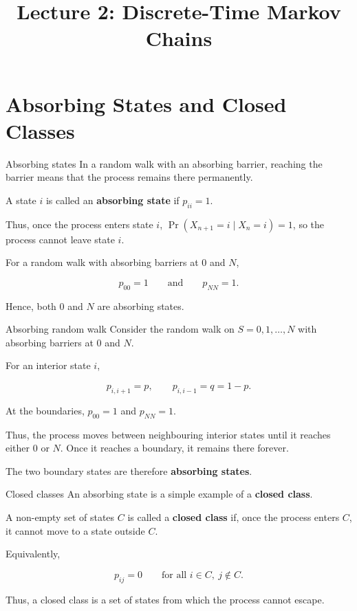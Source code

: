 \documentclass[
  ignorenonframetext,
  aspectratio=169,
]{beamer}
\title{\texorpdfstring{Lecture 2: Discrete-Time Markov
Chains}{Lecture 2: Discrete-Time Markov Chains}}
\author{}
\date{}
\begin{document}
\frame{\titlepage}


\section{Absorbing States and Closed
Classes}\label{absorbing-states-and-closed-classes}

\begin{frame}{Absorbing states}
\protect{}\label{absorbing-states}
In a random walk with an absorbing barrier, reaching the barrier means
that the process remains there permanently.

A state \(i\) is called an \textbf{absorbing state} if \(p_{ii}=1\).

Thus, once the process enters state \(i\),
\(\Pr(X_{n+1}=i\mid X_n=i)=1\), so the process cannot leave state \(i\).

For a random walk with absorbing barriers at \(0\) and \(N\),

\[
p_{00}=1
\qquad\text{and}\qquad
p_{NN}=1.
\]

Hence, both \(0\) and \(N\) are absorbing states.
\end{frame}

\begin{frame}{Absorbing random walk}
\protect{}\label{absorbing-random-walk}
Consider the random walk on \(S={0,1,\ldots,N}\) with absorbing barriers
at \(0\) and \(N\).

For an interior state \(i\),

\[
p_{i,i+1}=p,
\qquad
p_{i,i-1}=q=1-p.
\]

At the boundaries, \(p_{00}=1\) and \(p_{NN}=1\).

Thus, the process moves between neighbouring interior states until it
reaches either \(0\) or \(N\). Once it reaches a boundary, it remains
there forever.

The two boundary states are therefore \textbf{absorbing states}.
\end{frame}

\begin{frame}{Closed classes}
\protect{}\label{closed-classes}
An absorbing state is a simple example of a \textbf{closed class}.

A non-empty set of states \(C\) is called a \textbf{closed class} if,
once the process enters \(C\), it cannot move to a state outside \(C\).

Equivalently,

\[
p_{ij}=0
\qquad
\text{for all }i\in C,\ j\notin C.
\]

Thus, a closed class is a set of states from which the process cannot
escape.
\end{frame}
\end{document}
